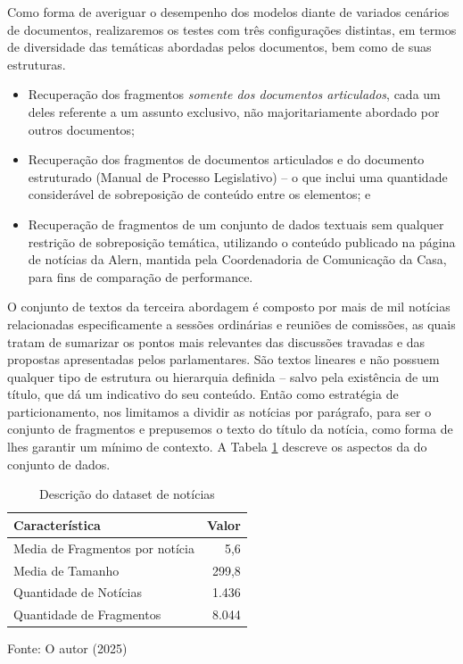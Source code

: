 Como forma de averiguar o desempenho dos modelos diante de variados cenários de documentos, realizaremos os testes com três configurações distintas, em termos de diversidade das temáticas abordadas pelos documentos, bem como de suas estruturas. 

\begin{itemize}
    \item Recuperação dos fragmentos \textit{somente dos documentos articulados}, cada um deles referente a um assunto exclusivo, não majoritariamente abordado por outros documentos;
    \item Recuperação dos fragmentos de documentos articulados e do documento estruturado (Manual de Processo Legislativo) -- o que inclui uma quantidade considerável de sobreposição de conteúdo entre os elementos; e
    \item Recuperação de fragmentos de um conjunto de dados textuais sem qualquer restrição de sobreposição temática, utilizando o conteúdo publicado na página de notícias da Alern, mantida pela Coordenadoria de Comunicação da Casa, para fins de comparação de performance.
\end{itemize} 


O conjunto de textos da terceira abordagem é composto por mais de mil notícias relacionadas especificamente a sessões ordinárias e reuniões de comissões, as quais tratam de sumarizar os pontos mais relevantes das discussões travadas e das propostas apresentadas pelos parlamentares. São textos lineares e não possuem qualquer tipo de estrutura ou hierarquia definida -- salvo pela existência de um título, que dá um indicativo do seu conteúdo. Então como estratégia de particionamento, nos limitamos a dividir as notícias por parágrafo, para ser o conjunto de fragmentos e prepusemos o texto do título da notícia, como forma de lhes garantir um mínimo de contexto. A Tabela \ref{tab:descricao-noticias} descreve os aspectos da do conjunto de dados.

\begin{table}[H]
    \caption{Descrição do dataset de notícias}
    \centering
    \begin{tabular}{ l r }
        \hline
        \bfseries Característica & \bfseries Valor \\
        \hline
        Media de Fragmentos por notícia & 5,6 \\
        Media de Tamanho & 299,8 \\
        Quantidade de Notícias & 1.436 \\
        Quantidade de Fragmentos & 8.044 \\
        \hline
    \end{tabular}
    
    Fonte: O autor (2025)
    \label{tab:descricao-noticias}
\end{table}

